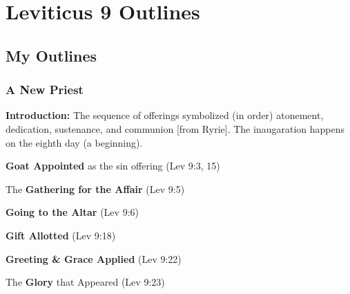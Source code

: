 \section{Leviticus 9 Outlines}

\subsection{My Outlines}

\subsubsection{A New Priest}
\textbf{Introduction: }The sequence of offerings symbolized (in order) atonement, dedication, sustenance, and communion [from Ryrie]. The inaugaration happens on the eighth day (a beginning).
\begin{compactenum}[I.][7]
    \item \textbf{Goat Appointed} as the sin offering (Lev 9:3, 15)
    \item The \textbf{Gathering for the Affair} (Lev 9:5)
    \item \textbf{Going to the Altar} (Lev 9:6)
    \item \textbf{Gift Allotted} (Lev 9:18)
     \item \textbf{Greeting \& Grace Applied} (Lev 9:22)
   \item The \textbf{Glory} that Appeared (Lev 9:23)
\end{compactenum}
